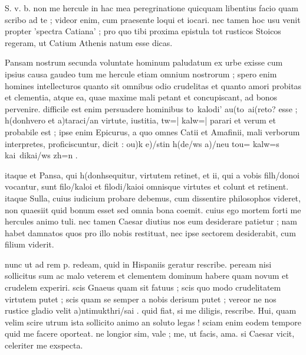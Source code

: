 


 S. v. b. non me hercule in hac mea peregrinatione quicquam libentius facio quam scribo ad te ; videor enim, cum praesente loqui et iocari. nec tamen hoc usu venit propter 'spectra Catiana' ; pro quo tibi proxima epistula tot rusticos Stoicos regeram, ut Catium Athenis natum esse dicas.

 Pansam nostrum secunda voluntate hominum paludatum ex urbe exisse cum ipsius causa gaudeo tum me hercule etiam omnium nostrorum ; spero enim homines intellecturos quanto sit omnibus odio crudelitas et quanto amori probitas et clementia, atque ea, quae maxime mali petant et concupiscant, ad bonos pervenire. difficile est enim persuadere hominibus to\ kalo\n di' au(to\ ai(reto\n ? esse ; h(donh\n vero et a)taraci/an virtute, iustitia, tw=| kalw=| parari et verum et probabile est ; ipse enim Epicurus, a quo omnes Catii et Amafinii, mali verborum interpretes, proficiscuntur, dicit : ou)k e)/stin h(de/ws a)/neu tou= kalw=s kai\ dikai/ws zh=n .

 itaque et Pansa, qui h(donh\n sequitur, virtutem retinet, et ii, qui a vobis filh/donoi vocantur, sunt filo/kaloi et filodi/kaioi omnisque virtutes et colunt et retinent. itaque Sulla, cuius iudicium probare debemus, cum dissentire philosophos videret, non quaesiit quid bonum esset sed omnia bona coemit. cuius ego mortem forti me hercules animo tuli. nec tamen Caesar diutius nos eum desiderare patietur ; nam habet damnatos quos pro illo nobis restituat, nec ipse sectorem desiderabit, cum filium viderit.

 nunc ut ad rem p. redeam, quid in Hispaniis geratur rescribe. peream nisi sollicitus sum ac malo veterem et clementem dominum habere quam novum et crudelem experiri. scis Gnaeus quam sit fatuus ; scis quo modo crudelitatem virtutem putet ; scis quam se semper a nobis derisum putet ; vereor ne nos rustice gladio velit a)ntimukthri/sai . quid fiat, si me diligis, rescribe. Hui, quam velim scire utrum ista sollicito animo an soluto legas ! sciam enim eodem tempore quid me facere oporteat. ne longior sim, vale ; me, ut facis, ama. si Caesar vicit, celeriter me exspecta.
